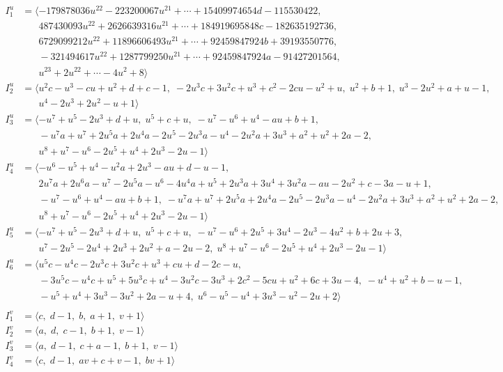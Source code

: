 \documentclass[1p]{elsarticle_modified}
\theoremstyle{definition}
\begin{document}
\begin{align*}
I^u_{1}&=\langle 
-179878036 u^{22}-223200067 u^{21}+\cdots+15409974654 d-115530422,\\
\phantom{I^u_{1}}&\phantom{= \langle  }487430093 u^{22}+2626639316 u^{21}+\cdots+184919695848 c-182635192736,\\
\phantom{I^u_{1}}&\phantom{= \langle  }6729099212 u^{22}+11896606493 u^{21}+\cdots+92459847924 b+39193550776,\\
\phantom{I^u_{1}}&\phantom{= \langle  }-321494617 u^{22}+1287799250 u^{21}+\cdots+92459847924 a-91427201564,\\
\phantom{I^u_{1}}&\phantom{= \langle  }u^{23}+2 u^{22}+\cdots-4 u^2+8\rangle \\
I^u_{2}&=\langle 
u^2 c- u^3- c u+u^2+d+c-1,\;-2 u^3 c+3 u^2 c+u^3+c^2-2 c u- u^2+u,\;u^2+b+1,\;u^3-2 u^2+a+u-1,\\
\phantom{I^u_{2}}&\phantom{= \langle  }u^4-2 u^3+2 u^2- u+1\rangle \\
I^u_{3}&=\langle 
- u^7+u^5-2 u^3+d+u,\;u^5+c+u,\;- u^7- u^6+u^4- a u+b+1,\\
\phantom{I^u_{3}}&\phantom{= \langle  }- u^7 a+u^7+2 u^5 a+2 u^4 a-2 u^5-2 u^3 a- u^4-2 u^2 a+3 u^3+a^2+u^2+2 a-2,\\
\phantom{I^u_{3}}&\phantom{= \langle  }u^8+u^7- u^6-2 u^5+u^4+2 u^3-2 u-1\rangle \\
I^u_{4}&=\langle 
- u^6- u^5+u^4- u^2 a+2 u^3- a u+d- u-1,\\
\phantom{I^u_{4}}&\phantom{= \langle  }2 u^7 a+2 u^6 a- u^7-2 u^5 a- u^6-4 u^4 a+u^5+2 u^3 a+3 u^4+3 u^2 a- a u-2 u^2+c-3 a- u+1,\\
\phantom{I^u_{4}}&\phantom{= \langle  }- u^7- u^6+u^4- a u+b+1,\;- u^7 a+u^7+2 u^5 a+2 u^4 a-2 u^5-2 u^3 a- u^4-2 u^2 a+3 u^3+a^2+u^2+2 a-2,\\
\phantom{I^u_{4}}&\phantom{= \langle  }u^8+u^7- u^6-2 u^5+u^4+2 u^3-2 u-1\rangle \\
I^u_{5}&=\langle 
- u^7+u^5-2 u^3+d+u,\;u^5+c+u,\;- u^7- u^6+2 u^5+3 u^4-2 u^3-4 u^2+b+2 u+3,\\
\phantom{I^u_{5}}&\phantom{= \langle  }u^7-2 u^5-2 u^4+2 u^3+2 u^2+a-2 u-2,\;u^8+u^7- u^6-2 u^5+u^4+2 u^3-2 u-1\rangle \\
I^u_{6}&=\langle 
u^5 c- u^4 c-2 u^3 c+3 u^2 c+u^3+c u+d-2 c- u,\\
\phantom{I^u_{6}}&\phantom{= \langle  }-3 u^5 c- u^4 c+u^5+5 u^3 c+u^4-3 u^2 c-3 u^3+2 c^2-5 c u+u^2+6 c+3 u-4,\;- u^4+u^2+b- u-1,\\
\phantom{I^u_{6}}&\phantom{= \langle  }- u^5+u^4+3 u^3-3 u^2+2 a- u+4,\;u^6- u^5- u^4+3 u^3- u^2-2 u+2\rangle \\
\\
I^v_{1}&=\langle 
c,\;d-1,\;b,\;a+1,\;v+1\rangle \\
I^v_{2}&=\langle 
a,\;d,\;c-1,\;b+1,\;v-1\rangle \\
I^v_{3}&=\langle 
a,\;d-1,\;c+a-1,\;b+1,\;v-1\rangle \\
I^v_{4}&=\langle 
c,\;d-1,\;a v+c+v-1,\;b v+1\rangle \\
\end{align*}
\end{document}
